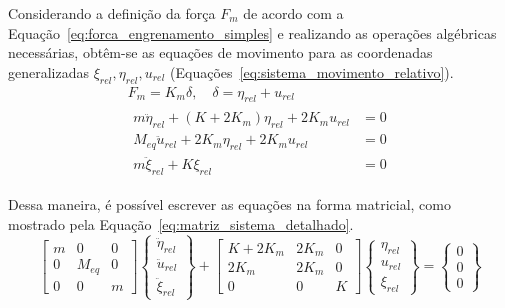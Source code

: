 Considerando a definição da força $F_m$ de acordo com a Equação~\ref{eq:forca_engrenamento_simples} e realizando as operações algébricas necessárias, obtêm-se as equações de movimento para as coordenadas generalizadas $\xi_{rel}, \eta_{rel}, u_{rel}$ (Equações~\ref{eq:sistema_movimento_relativo}).
\begin{gather}
	F_m = K_m \delta, \quad \delta = \eta_{rel} + u_{rel}
	\label{eq:forca_engrenamento_simples}
\\
	\begin{aligned}
		m\ddot{\eta}_{rel} + (K + 2K_m)\eta_{rel} + 2K_m u_{rel} &= 0 \\
		M_{eq}\ddot{u}_{rel} + 2K_m \eta_{rel} + 2K_m u_{rel} &= 0 \\
		m\ddot{\xi}_{rel} + K\xi_{rel} &= 0
	\end{aligned}
	\label{eq:sistema_movimento_relativo}
\end{gather}

Dessa maneira, é possível escrever as equações na forma matricial, como mostrado pela Equação~\ref{eq:matriz_sistema_detalhado}.
\begin{equation}
	\begin{bmatrix} 
		m & 0 & 0 \\ 
		0 & M_{eq} & 0 \\ 
		0 & 0 & m 
	\end{bmatrix} 
	\begin{Bmatrix} 
		\ddot{\eta}_{rel} \\ 
		\ddot{u}_{rel} \\ 
		\ddot{\xi}_{rel} 
	\end{Bmatrix} 
	+ 
	\begin{bmatrix} 
		K+2K_m & 2K_m & 0 \\ 
		2K_m & 2K_m & 0 \\ 
		0 & 0 & K 
	\end{bmatrix} 
	\begin{Bmatrix} 
		\eta_{rel} \\ 
		u_{rel} \\ 
		\xi_{rel} 
	\end{Bmatrix} 
	= 
	\begin{Bmatrix} 
		0 \\ 
		0 \\ 
		0 
	\end{Bmatrix}
	\label{eq:matriz_sistema_detalhado}
\end{equation}

